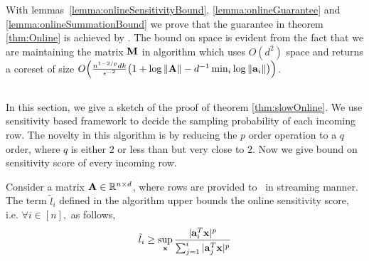With lemmas~\ref{lemma:onlineSensitivityBound}, \ref{lemma:onlineGuarantee} and \ref{lemma:onlineSummationBound} we prove that the guarantee in theorem \ref{thm:Online} is achieved by \online. The bound on space is evident from the fact that we are maintaining the matrix $\mathbf{M}$ in algorithm which uses $O(d^{2})$ space and returns a coreset of size $O\Big(\frac{n^{1-2/p}dk}{\epsilon^{-2}}\big(1+\log\|\mathbf{A}\|-d^{-1}\min_{i}\log \|\mathbf{a}_{i}\|\big)\Big)$. 
% 
\subsection{}
In this section, we give a sketch of the proof of theorem \ref{thm:slowOnline}. We use sensitivity based framework to decide the sampling probability of each incoming row. The novelty in this algorithm is by reducing the $p$ order operation to a $q$ order, where $q$ is either $2$ or less than but very close to $2$. Now we give bound on sensitivity score of every incoming row.
% 
\begin{lemma}{\label{lemma:slowOnlineSensitivityBound}}
 Consider a matrix $\mathbf{A} \in \mathbb{R}^{n \times d}$, where rows are provided to ~in streaming manner. The term $\tilde{l}_{i}$ defined in the algorithm upper bounds the online sensitivity score, i.e. $\forall i \in [n],$ as follows,
 \begin{equation*}
  \tilde{l}_{i} \geq \sup_{\mathbf{x}}\frac{|\mathbf{a}_{i}^{T}\mathbf{x}|^{p}}{\sum_{j=1}^{i}|\mathbf{a}_{j}^{T}\mathbf{x}|^{p}}
 \end{equation*}
\end{lemma}
% 
